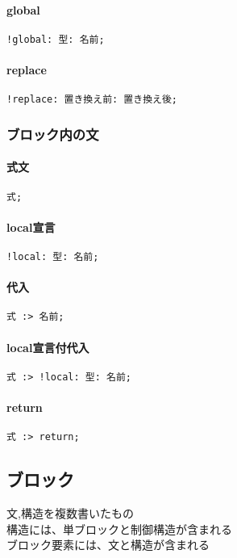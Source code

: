         \paragraph{global}
\begin{lstlisting}[]
!global: 型: 名前;
\end{lstlisting}
        \paragraph{replace}
\begin{lstlisting}[]
!replace: 置き換え前: 置き換え後;
\end{lstlisting}

    \subsubsection{ブロック内の文}
        \paragraph{式文}
\begin{lstlisting}[]
式;
\end{lstlisting}
        \paragraph{local宣言}
\begin{lstlisting}[]
!local: 型: 名前;
\end{lstlisting}
        \paragraph{代入}
\begin{lstlisting}[]
式 :> 名前;
\end{lstlisting}
        \paragraph{local宣言付代入}
\begin{lstlisting}[]
式 :> !local: 型: 名前;
\end{lstlisting}
        \paragraph{return}
\begin{lstlisting}[]
式 :> return;
\end{lstlisting}


\subsection{ブロック}
文,構造を複数書いたもの\\
構造には、単ブロックと制御構造が含まれる\\
ブロック要素には、文と構造が含まれる

